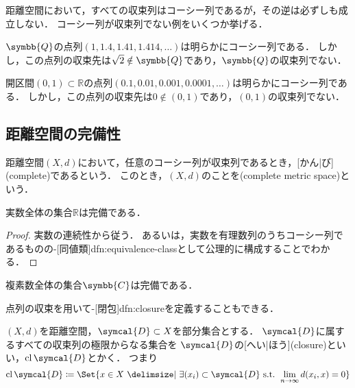 \documentclass[../sotsu.tex]{subfiles}
\begin{document}
距離空間において，すべての収束列はコーシー列であるが，その逆は必ずしも成立しない．
コーシー列が収束列でない例をいくつか挙げる．

\begin{example}
    $\symbb{Q}$の点列$(1, 1.4, 1.41, 1.414, \dotsc)$は明らかにコーシー列である．
    しかし，この点列の収束先は$\sqrt{2} \notin \symbb{Q}$であり，$\symbb{Q}$の収束列でない．
\end{example}

\begin{example}
    開区間$(0, 1) \subset ℝ$の点列$(0.1, 0.01, 0.001, 0.0001, \dotsc)$は明らかにコーシー列である．
    しかし，この点列の収束先は$0 \notin (0, 1)$であり，$(0, 1)$の収束列でない．
\end{example}


\subsection{距離空間の完備性}

\begin{definition}
    距離空間$(X, d)$において，任意のコーシー列が収束列であるとき，[かん|び](complete)であるという．
    このとき，$(X, d)$のことを(complete metric space)という．
\end{definition}


\begin{proposition}[実数の完備性]
    実数全体の集合$ℝ$は完備である．
\end{proposition}

\begin{proof}
    実数の連続性から従う．
    あるいは，実数を有理数列のうちコーシー列であるものの-[同値類]{dfn:equivalence-class}として公理的に構成することでわかる\cite[付録]{uchida-set-2020}．
\end{proof}


\begin{corollary}
    複素数全体の集合$\symbb{C}$は完備である．
\end{corollary}


点列の収束を用いて-[閉包]{dfn:closure}を定義することもできる．

\begin{definition}[点列による閉包の定義]
    \label{dfn:closure-by-sequence}
    $(X, d)$を距離空間，$\symcal{D} \subset X$を部分集合とする．
    $\symcal{D}$に属するすべての収束列の極限からなる集合を
    $\symcal{D}$の[へい|ほう](closure)といい，$\closure{\symcal{D}}$とかく．
    つまり
    \begin{equation}
        \closure{\symcal{D}} \coloneq \Set{ x \in X  \given  \exists (x_i) \subset \symcal{D} \text{ s.t. } \lim_{n \to \infty} d(x_i, x) = 0 }
    \end{equation}
\end{definition}
\end{document}
